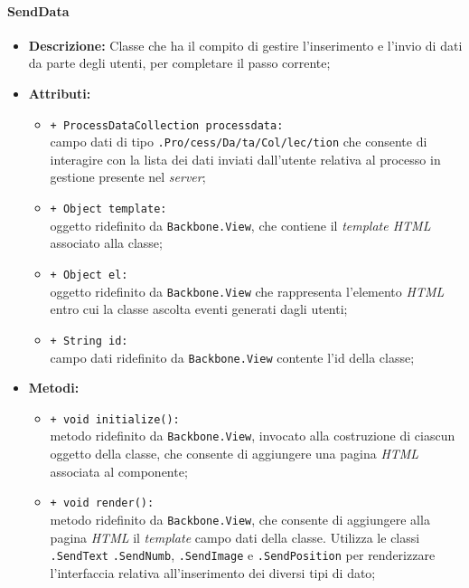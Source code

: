 \paragraph{SendData}
\begin{flushleft}
\begin{itemize}
\item \textbf{Descrizione:} Classe che ha il compito di gestire l'inserimento e l'invio di dati da parte degli utenti, per completare il passo corrente;
\item \textbf{Attributi:}
\begin{sloppypar}
\begin{itemize}
\item \texttt{+ ProcessDataCollection processdata:}\\ campo dati di tipo \texttt{\collection{}.Pro\fshyp{}cess\fshyp{}Da\fshyp{}ta\fshyp{}Col\fshyp{}lec\fshyp{}tion} che consente di interagire con la lista dei dati inviati dall'utente relativa al processo in gestione presente nel \textit{server};
\item \texttt{+ Object template:}\\ oggetto ridefinito da \texttt{Backbone.View}, che contiene il \textit{template HTML} associato alla classe;
\item \texttt{+ Object el:}\\ oggetto ridefinito da \texttt{Backbone.View} che rappresenta l'elemento \textit{HTML} entro cui la classe ascolta eventi generati dagli utenti;
\item \texttt{+ String id:}\\ campo dati ridefinito da \texttt{Backbone.View} contente l'id della classe;
\end{itemize}
\end{sloppypar}
\item \textbf{Metodi:}
\begin{sloppypar}
\begin{itemize}
\item \texttt{+ void initialize():}\\ metodo ridefinito da \texttt{Backbone.View}, invocato alla costruzione di ciascun oggetto della classe, che consente di aggiungere una pagina \textit{HTML} associata al componente;
\item \texttt{+ void render():}\\ metodo ridefinito da \texttt{Backbone.View}, che consente di aggiungere alla pagina \textit{HTML} il \textit{template} campo dati della classe. Utilizza le classi \texttt{\logicUser{}.SendText} \texttt{\logicUser{}.SendNumb}, \texttt{\logicUser{}.SendImage} e \texttt{\logicUser{}.SendPosition} per renderizzare l'interfaccia relativa all'inserimento dei diversi tipi di dato;

\end{itemize}
\end{sloppypar}
\end{itemize}
\end{flushleft}
